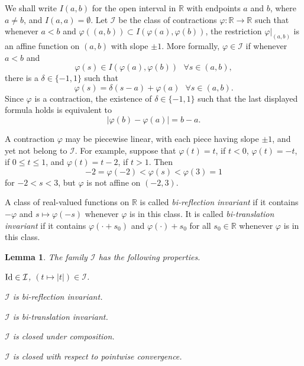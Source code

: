 \documentclass[12pt,reqno]{amsart}
\newcommand{\R}{{\mathbb R}}
\newcommand{\cI}{\mathcal I}
\newtheorem{lem}[thm]{Lemma}
\numberwithin{equation}{section}
\begin{document}
We shall write $I(a,b)$ for the open interval in $\R$ with endpoints $a$ and $b$, where $a\ne b$, and  $I(a,a)=\emptyset$. Let $\cI$ be the class of contractions $\varphi:\R\to \R$ such that whenever $a<b$ and $\varphi((a,b))\subset I(\varphi(a),\varphi(b))$, the restriction $\varphi|_{(a,b)}$ is an affine function on $(a,b)$ with slope $\pm 1$. More formally, $\varphi\in\cI$ if whenever $a<b$ and
\begin{equation}\label{I1m}
	\varphi(s)\in I(\varphi(a),\varphi(b))
	\ \ \ \forall s\in (a,b),
\end{equation}
there is a $\delta\in \{-1,1\}$ such that
\[
\varphi(s)=\delta(s-a)+\varphi(a)\ \ \ \forall s\in (a,b).
\]
Since $\varphi$ is a contraction, the existence of $\delta\in \{-1,1\}$ such that the last displayed formula holds is equivalent to
$$
|\varphi(b)-\varphi(a)| = b-a.
$$

A contraction $\varphi$ may be piecewise linear, with each piece having slope $\pm 1$, and yet not belong to $\cI$. For example, suppose that $\varphi(t)=t$, if $t<0$, $\varphi(t)=-t$, if $0\le t\le 1$, and $\varphi(t)=t-2$, if $t>1$.  Then
$$-2=\varphi(-2)<\varphi(s)<\varphi(3)=1$$
for $-2<s<3$, but $\varphi$ is not affine on $(-2,3)$.

A class of real-valued functions on $\R$ is called \emph{bi-reflection invariant} if it contains $-\varphi$ and $s\mapsto \varphi(-s)$ whenever $\varphi$  is in this class. It is called
\emph{bi-translation invariant} if it contains $\varphi(\cdot+s_0)$ and $\varphi(\cdot)+s_0$ for all $s_0\in \R$ whenever $\varphi$ is in this class.

\begin{lem}\label{restate}
The family $\cI$ has the following properties.

 ${\rm{Id}}\in \cI$, $(t\mapsto |t|)\in \cI$.

 $\cI$ is bi-reflection invariant.

 $\cI$ is bi-translation invariant.

 $\cI$ is closed under composition.

 $\cI$ is closed with respect to pointwise convergence.
\end{lem}
\end{document}
